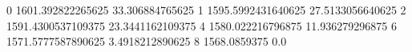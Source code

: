 0 1601.392822265625 33.306884765625
1 1595.5992431640625 27.5133056640625
2 1591.4300537109375 23.3441162109375
4 1580.022216796875 11.936279296875
6 1571.5777587890625 3.4918212890625
8 1568.0859375 0.0
